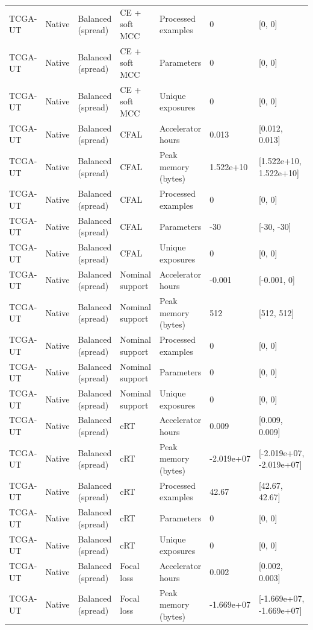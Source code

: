 \begin{longtable}{lllllll}
TCGA-UT & Native & Balanced (spread) & CE + soft MCC & Processed examples & 0 & [0, 0] \\
TCGA-UT & Native & Balanced (spread) & CE + soft MCC & Parameters & 0 & [0, 0] \\
TCGA-UT & Native & Balanced (spread) & CE + soft MCC & Unique exposures & 0 & [0, 0] \\
TCGA-UT & Native & Balanced (spread) & CFAL & Accelerator hours & 0.013 & [0.012, 0.013] \\
TCGA-UT & Native & Balanced (spread) & CFAL & Peak memory (bytes) & 1.522e+10 & [1.522e+10, 1.522e+10] \\
TCGA-UT & Native & Balanced (spread) & CFAL & Processed examples & 0 & [0, 0] \\
TCGA-UT & Native & Balanced (spread) & CFAL & Parameters & -30 & [-30, -30] \\
TCGA-UT & Native & Balanced (spread) & CFAL & Unique exposures & 0 & [0, 0] \\
TCGA-UT & Native & Balanced (spread) & Nominal support & Accelerator hours & -0.001 & [-0.001, 0] \\
TCGA-UT & Native & Balanced (spread) & Nominal support & Peak memory (bytes) & 512 & [512, 512] \\
TCGA-UT & Native & Balanced (spread) & Nominal support & Processed examples & 0 & [0, 0] \\
TCGA-UT & Native & Balanced (spread) & Nominal support & Parameters & 0 & [0, 0] \\
TCGA-UT & Native & Balanced (spread) & Nominal support & Unique exposures & 0 & [0, 0] \\
TCGA-UT & Native & Balanced (spread) & cRT & Accelerator hours & 0.009 & [0.009, 0.009] \\
TCGA-UT & Native & Balanced (spread) & cRT & Peak memory (bytes) & -2.019e+07 & [-2.019e+07, -2.019e+07] \\
TCGA-UT & Native & Balanced (spread) & cRT & Processed examples & 42.67 & [42.67, 42.67] \\
TCGA-UT & Native & Balanced (spread) & cRT & Parameters & 0 & [0, 0] \\
TCGA-UT & Native & Balanced (spread) & cRT & Unique exposures & 0 & [0, 0] \\
TCGA-UT & Native & Balanced (spread) & Focal loss & Accelerator hours & 0.002 & [0.002, 0.003] \\
TCGA-UT & Native & Balanced (spread) & Focal loss & Peak memory (bytes) & -1.669e+07 & [-1.669e+07, -1.669e+07] \\

\end{longtable}
